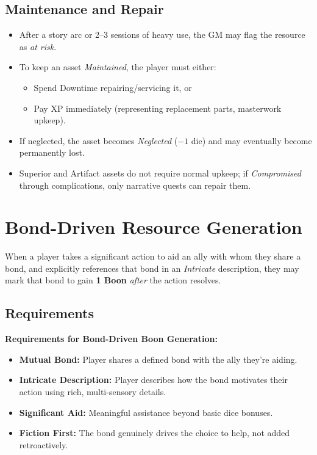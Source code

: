 \subsection{Maintenance and Repair}
\label{subsec:asset-maintenance}

\begin{itemize}
\item After a story arc or 2--3 sessions of heavy use, the GM may flag the resource as \emph{at risk}. 
\item To keep an asset \emph{Maintained}, the player must either:
  \begin{itemize}
  \item Spend Downtime repairing/servicing it, or 
  \item Pay XP immediately (representing replacement parts, masterwork upkeep). 
  \end{itemize}
\item If neglected, the asset becomes \emph{Neglected} ($-1$ die) and may eventually become permanently lost. 
\item Superior and Artifact assets do not require normal upkeep; if \emph{Compromised} through complications, only narrative quests can repair them. 
\end{itemize}

\section{Bond-Driven Resource Generation}
\label{sec:bond-resources}

When a player takes a significant action to aid an ally with whom they share a bond, and explicitly references that bond in an \emph{Intricate} description, they may mark that bond to gain \textbf{1 Boon} \emph{after} the action resolves. 

\subsection{Requirements}
\label{subsec:bond-requirements}

\textbf{Requirements for Bond-Driven Boon Generation:}
\begin{itemize}
    \item \textbf{Mutual Bond:} Player shares a defined bond with the ally they're aiding. 
    \item \textbf{Intricate Description:} Player describes how the bond motivates their action using rich, multi-sensory details. 
    \item \textbf{Significant Aid:} Meaningful assistance beyond basic dice bonuses. 
    \item \textbf{Fiction First:} The bond genuinely drives the choice to help, not added retroactively. 
\end{itemize}

